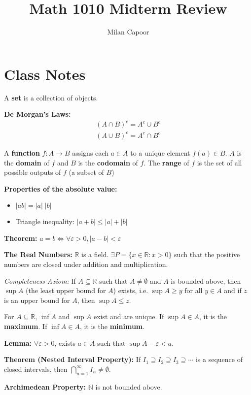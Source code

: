 \documentclass[12pt]{article}
\title{Math 1010 Midterm Review}
\author{Milan Capoor}
\date{}
\newcommand{\R}{\mathbb{R}}
\newcommand{\N}{\mathbb{N}}
\newcommand{\abs}[1]{\left\vert #1 \right\vert}
\newcommand{\ep}{\varepsilon}
\begin{document}
\maketitle

\section{Class Notes}
A \textbf{set} is a collection of objects. 

\textbf{De Morgan's Laws:}
\begin{align*}
    (A \cap B)^c = A^c \cup B^c \\
    (A \cup B)^c = A^c \cap B^c
\end{align*}

A \textbf{function} $f: A \to B$ assigns each $a \in A$ to a unique element $f(a) \in B$. $A$ is the \textbf{domain} of $f$ and $B$ is the \textbf{codomain} of $f$. The \textbf{range} of $f$ is the set of all possible outputs of $f$ (a subset of $B$)

\textbf{Properties of the absolute value:}
\begin{itemize}
    \item $\abs{ab} = \abs{a} \; \abs{b}$
    \item Triangle inequality: $\abs{a + b} \leq \abs{a} + \abs{b}$
\end{itemize}

\textbf{Theorem:} $a = b \iff \forall \ep > 0, \abs{a - b} < \ep$

\textbf{The Real Numbers:} $\R$ is a field. $\exists P = \{x \in \R: x > 0\}$ such that the positive numbers are closed under addition and multiplication.

\emph{Completeness Axiom:} If $A \subseteq \R$ such that $A \neq \emptyset$ and $A$ is bounded above, then $\sup A$ (the least upper bound for $A$) exists, i.e. $\sup A \geq y$ for all $y \in A$ and if $z$ is an upper bound for $A$, then $\sup A \leq z$.

For $A \subseteq \R$, $\inf A$ and $\sup A$ exist and are unique. If $\sup A \in A$, it is the \textbf{maximum}. If $\inf A \in A$, it is the \textbf{minimum}.

\textbf{Lemma:} $\forall \ep > 0$, exists $a \in A$ such that $\sup A - \ep < a$.

\textbf{Theorem (Nested Interval Property):} If $I_1 \supseteq I_2 \supseteq I_3 \supseteq \cdots$ is a sequence of closed intervals, then $\bigcap_{n=1}^\infty I_n \neq \emptyset$.

\textbf{Archimedean Property:} $\N$ is not bounded above. 
\end{document}
